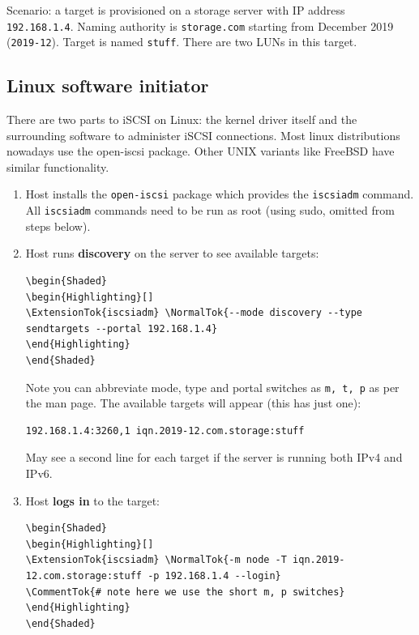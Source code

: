 Scenario: a target is provisioned on a storage server with IP address
\texttt{192.168.1.4}. Naming authority is \texttt{storage.com} starting
from December 2019 (\texttt{2019-12}). Target is named \texttt{stuff}.
There are two LUNs in this target.

\subsection{Linux software initiator}\label{linux-software-initiator}

There are two parts to iSCSI on Linux: the kernel driver itself and the
surrounding software to administer iSCSI connections. Most linux
distributions nowadays use the open-iscsi package. Other UNIX variants
like FreeBSD have similar functionality.

\begin{enumerate}
\def\labelenumi{\arabic{enumi}.}
\item
  Host installs the \texttt{open-iscsi} package which provides the
  \texttt{iscsiadm} command. All \texttt{iscsiadm} commands need to be
  run as root (using sudo, omitted from steps below).
\item
  Host runs \textbf{discovery} on the server to see available targets:

\begin{verbatim}
\begin{Shaded}
\begin{Highlighting}[]
\ExtensionTok{iscsiadm} \NormalTok{--mode discovery --type sendtargets --portal 192.168.1.4}
\end{Highlighting}
\end{Shaded}
\end{verbatim}

  Note you can abbreviate mode, type and portal switches as
  \texttt{m,\ t,\ p} as per the man page. The available targets will
  appear (this has just one):

\begin{verbatim}
192.168.1.4:3260,1 iqn.2019-12.com.storage:stuff
\end{verbatim}

  May see a second line for each target if the server is running both
  IPv4 and IPv6.
\item
  Host \textbf{logs in} to the target:

\begin{verbatim}
\begin{Shaded}
\begin{Highlighting}[]
\ExtensionTok{iscsiadm} \NormalTok{-m node -T iqn.2019-12.com.storage:stuff -p 192.168.1.4 --login}
\CommentTok{# note here we use the short m, p switches}
\end{Highlighting}
\end{Shaded}
\end{verbatim}


\end{enumerate}
